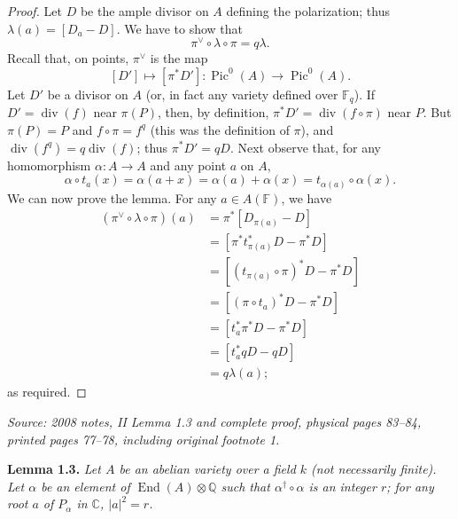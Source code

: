 \documentclass[11pt]{article}
\DeclareMathOperator{\AVEnd}{End}
\DeclareMathOperator{\AVPic}{Pic}
\DeclareMathOperator{\AVdiv}{div}
\newcommand{\AVQ}{\mathbb{Q}}
\newcommand{\AVC}{\mathbb{C}}
\newcommand{\AVF}{\mathbb{F}}
\newcommand{\AVsrc}[1]{\par\smallskip\noindent\textit{Source: #1.}\par\smallskip}
\begin{document}
\begin{proof}
Let $D$ be the ample divisor on $A$ defining the polarization; thus
$\lambda(a)=[D_a-D]$. We have to show that
\[
\pi^{\vee}\circ\lambda\circ\pi=q\lambda.
\]
Recall that, on points, $\pi^{\vee}$ is the map
\[
[D']\longmapsto[\pi^*D']:\AVPic^0(A)\longrightarrow\AVPic^0(A).
\]
Let $D'$ be a divisor on $A$ (or, in fact any variety defined over
$\AVF_q$). If $D'=\AVdiv(f)$ near $\pi(P)$, then, by definition,
$\pi^*D'=\AVdiv(f\circ\pi)$ near $P$. But $\pi(P)=P$ and
$f\circ\pi=f^q$ (this was the definition of $\pi$), and
$\AVdiv(f^q)=q\AVdiv(f)$; thus $\pi^*D'=qD$. Next observe that, for
any homomorphism $\alpha:A\to A$ and any point $a$ on $A$,
\[
\alpha\circ t_a(x)=\alpha(a+x)=\alpha(a)+\alpha(x)
=t_{\alpha(a)}\circ\alpha(x).
\]
We can now prove the lemma. For any $a\in A(\AVF)$, we have
\begin{align*}
(\pi^{\vee}\circ\lambda\circ\pi)(a)
&=\pi^*[D_{\pi(a)}-D]\\
&=[\pi^*t_{\pi(a)}^*D-\pi^*D]\\
&=[(t_{\pi(a)}\circ\pi)^*D-\pi^*D]\\
&=[(\pi\circ t_a)^*D-\pi^*D]\\
&=[t_a^*\pi^*D-\pi^*D]\\
&=[t_a^*qD-qD]\\
&=q\lambda(a);
\end{align*}
as required.
\end{proof}

\AVsrc{2008 notes, II Lemma 1.3 and complete proof, physical pages 83--84,
printed pages 77--78, including original footnote 1}
\noindent\textbf{Lemma 1.3.}
\emph{Let $A$ be an abelian variety over a field $k$ (not necessarily
finite). Let $\alpha$ be an element of $\AVEnd(A)\otimes\AVQ$ such that
$\alpha^{\dagger}\circ\alpha$ is an integer $r$; for any root $a$ of
$P_\alpha$ in $\AVC$, $\lvert a\rvert^2=r$.}
\end{document}

